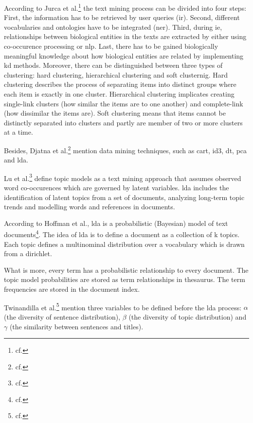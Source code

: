 According to Jurca et al.\footnote{cf.\autocite{jurca_2016}} the text mining process can be divided into four steps: First, the information has to be retrieved by user queries (\ac{ir}). Second, different vocabularies and ontologies have to be integrated (\ac{ner}). Third, during \ac{ie}, relationships between biological entities in the texts are extracted by either using co-occurence processing or \ac{nlp}. Last, there has to be gained biologically meaningful knowledge about how biological entities are related by implementing \ac{kd} methods.
Moreover, there can be distinguished between three types of clustering: hard clustering, hierarchical clustering and soft clusternig. Hard clustering describes the process of separating items into distinct groups where each item is exactly in one cluster. Hierarchical clustering implicates creating single-link clusters (how similar the items are to one another) and complete-link (how dissimilar the items are). Soft clustering means that items cannot be distinctly separated into clusters and partly are member of two or more clusters at a time.  

Besides, Djatna et al.\footnote{cf.\autocite{djatna_2018}} mention data mining techniques, such as \ac{cart}, \ac{id3}, \ac{dt}, \ac{pca} and \ac{lda}. 

Lu et al.\footnote{cf.\autocite{lu_2016}} define topic models as a text mining approach that assumes observed word co-occurences which are governed by latent variables. \ac{lda} includes the identification of latent topics from a set of documents, analyzing long-term topic trends and modelling words and references in documents.   

According to Hoffman et al., \ac{lda} is a probabilistic (Bayesian) model of text documents\footnote{cf.\autocite{hoffman_2010}}. The idea of \ac{lda} is to define a document as a collection of k topics. Each topic defines a multinominal distribution over a vocabulary which is drawn from a dirichlet.

What is more, every term has a probabilistic relationship to every document. The topic model probabilities are stored as term relationships in thesaurus. The term frequencies are stored in the document index.

Twinandilla et al.\footnote{cf.\autocite{twinandilla_2018}} mention three variables to be defined before the \ac{lda} process: $\alpha$ (the diversity of sentence distribution), $\beta$ (the diversity of topic distribution) and $\gamma$ (the similarity between sentences and titles).

